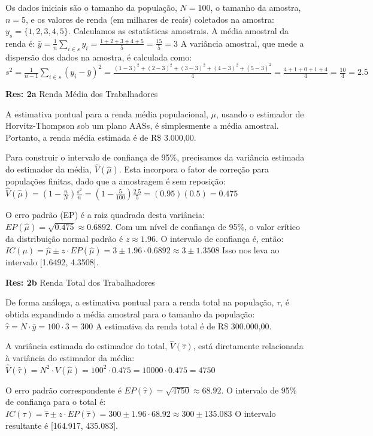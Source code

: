\documentclass[a4paper,11pt,oneside,twocolumn]{Config/milktest}
\begin{document}
{\scriptsize
	
	Os dados iniciais são o tamanho da população, $N=100$, o tamanho da amostra, $n=5$, e os valores de renda (em milhares de reais) coletados na amostra: $y_s = \{1, 2, 3, 4, 5\}$. Calculamos as estatísticas amostrais. A média amostral da renda é:
$ \bar{y} = \frac{1}{n} \sum_{i \in s} y_i = \frac{1+2+3+4+5}{5} = \frac{15}{5} = 3 $ 
A variância amostral, que mede a dispersão dos dados na amostra, é calculada como:
$ s^2 = \frac{1}{n-1} \sum_{i \in s} (y_i - \bar{y})^2 = \frac{(1-3)^2 + (2-3)^2 + (3-3)^2 + (4-3)^2 + (5-3)^2}{4} = \frac{4+1+0+1+4}{4} = \frac{10}{4} = 2.5 $

\textbf{Res:  2a}  Renda Média dos Trabalhadores

A estimativa pontual para a renda média populacional, $\mu$, usando o estimador de Horvitz-Thompson sob um plano AASs, é simplesmente a média amostral. Portanto, a renda média estimada é de R\$ 3.000,00.

Para construir o intervalo de confiança de 95\%, precisamos da variância estimada do estimador da média, $\hat{V}(\hat{\mu})$. Esta incorpora o fator de correção para populações finitas, dado que a amostragem é sem reposição:
$ \hat{V}(\hat{\mu}) = \left(1 - \frac{n}{N}\right) \frac{s^2}{n} = \left(1 - \frac{5}{100}\right) \frac{2.5}{5} = (0.95)(0.5) = 0.475 $

O erro padrão (EP) é a raiz quadrada desta variância: $EP(\hat{\mu}) = \sqrt{0.475} \approx 0.6892$.
Com um nível de confiança de 95\%, o valor crítico da distribuição normal padrão é $z \approx 1.96$. O intervalo de confiança é, então:
$ IC(\mu) = \hat{\mu} \pm z \cdot EP(\hat{\mu}) = 3 \pm 1.96 \cdot 0.6892 \approx 3 \pm 1.3508 $
Isso nos leva ao intervalo [1.6492, 4.3508].

\medskip
\textbf{Res:  2b}   Renda Total dos Trabalhadores

De forma análoga, a estimativa pontual para a renda total na população, $\tau$, é obtida expandindo a média amostral para o tamanho da população:
$ \hat{\tau} = N \cdot \bar{y} = 100 \cdot 3 = 300 $
A estimativa da renda total é de R\$ 300.000,00.

A variância estimada do estimador do total, $\hat{V}(\hat{\tau})$, está diretamente relacionada à variância do estimador da média:
$ \hat{V}(\hat{\tau}) = N^2 \cdot \hat{V}(\hat{\mu}) = 100^2 \cdot 0.475 = 10000 \cdot 0.475 = 4750 $

O erro padrão correspondente é $EP(\hat{\tau}) = \sqrt{4750} \approx 68.92$. O intervalo de 95\% de confiança para o total é:
$ IC(\tau) = \hat{\tau} \pm z \cdot EP(\hat{\tau}) = 300 \pm 1.96 \cdot 68.92 \approx 300 \pm 135.083 $
O intervalo resultante é [164.917, 435.083]. 

}
\end{document}
